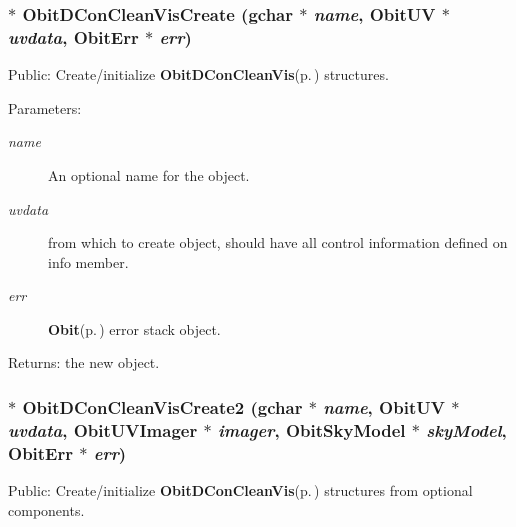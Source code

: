 \subsubsection{$\ast$ Obit\-DCon\-Clean\-Vis\-Create (gchar $\ast$ {\em name}, {\bf Obit\-UV} $\ast$ {\em uvdata}, {\bf Obit\-Err} $\ast$ {\em err})}\label{ObitDConCleanVis_8h_a11}


Public: Create/initialize {\bf Obit\-DCon\-Clean\-Vis}{\rm (p.\,\pageref{structObitDConCleanVis})} structures. 

\begin{Desc}
\item[Parameters:]
\begin{description}
\item[{\em name}]An optional name for the object. \item[{\em uvdata}]from which to create object, should have all control information defined on info member. \item[{\em err}]{\bf Obit}{\rm (p.\,\pageref{structObit})} error stack object. \end{description}
\end{Desc}
\begin{Desc}
\item[Returns:]the new object. \end{Desc}
\subsubsection{$\ast$ Obit\-DCon\-Clean\-Vis\-Create2 (gchar $\ast$ {\em name}, {\bf Obit\-UV} $\ast$ {\em uvdata}, {\bf Obit\-UVImager} $\ast$ {\em imager}, {\bf Obit\-Sky\-Model} $\ast$ {\em sky\-Model}, {\bf Obit\-Err} $\ast$ {\em err})}\label{ObitDConCleanVis_8h_a12}


Public: Create/initialize {\bf Obit\-DCon\-Clean\-Vis}{\rm (p.\,\pageref{structObitDConCleanVis})} structures from optional components. 

